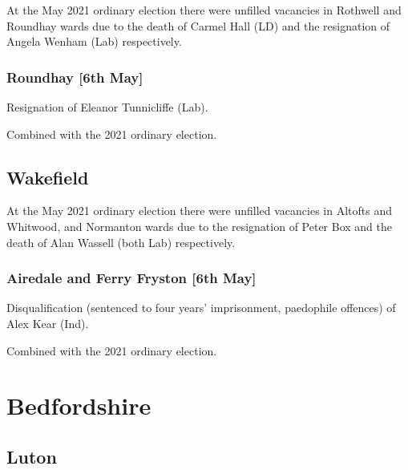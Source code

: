 \documentclass[a4paper,openany]{book}
\begin{document}
\begin{resultsiii}
At the May 2021 ordinary election there were unfilled vacancies in Rothwell and Roundhay wards due to the death of Carmel Hall (LD) and the resignation of Angela Wenham (Lab) respectively.

\subsubsection*{Roundhay \hspace*{\fill}\nolinebreak[1]%
	\enspace\hspace*{\fill}
	[6th May]}


Resignation of Eleanor Tunnicliffe (Lab).

Combined with the 2021 ordinary election.

\subsection*{Wakefield}

At the May 2021 ordinary election there were unfilled vacancies in Altofts and Whitwood, and Normanton wards due to the resignation of Peter Box and the death of Alan Wassell (both Lab) respectively.

\subsubsection*{Airedale and Ferry Fryston \hspace*{\fill}\nolinebreak[1]%
	\enspace\hspace*{\fill}
	[6th May]}


Disqualification (sentenced to four years' imprisonment, paedophile offences) of Alex Kear (Ind).

Combined with the 2021 ordinary election.

\section{Bedfordshire}

\subsection*{Luton}


\end{resultsiii}
\end{document}
